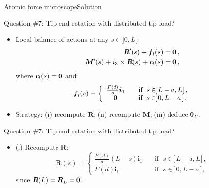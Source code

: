 \documentclass{beamer}
\newcommand{\cj}{c}
\newcommand{\cv}{{\boldsymbol\cj}}
\renewcommand{\ij}{i}
\newcommand{\iv}{{\boldsymbol\ij}}
\newcommand*{\drotj}{\theta}
\newcommand*{\drot}{{\boldsymbol\drotj}}
\newcommand{\fj}{f}
\newcommand{\fv}{{\boldsymbol\fj}}
\newcommand{\Fresj}{R}
\newcommand{\Mresj}{M}
\newcommand{\Fres}{{\boldsymbol\Fresj}}
\newcommand{\Mres}{{\boldsymbol\Mresj}}
\newcommand{\bzero}{{\bf 0}}
\begin{document}
\begin{frame}{Atomic force microscope}{Solution}

\begin{overprint}

\vskip-20pt
\begin{exampleblock}{Question \#7: Tip end rotation with distributed tip load?}
\begin{itemize}
\item Local balance of actions at any $s\in]0,L[$:
\begin{displaymath}
\begin{split}
\Fres'(s)+\fv_l(s) &=\bzero\,, \\
\Mres'(s)+\iv_3\times\Fres(s)+\cv_l(s) &=\bzero\,,
\end{split}
\end{displaymath}
where $\cv_l(s)=\bzero$ and:
\begin{displaymath}
\fv_l(s)=\left\{\begin{array}{cl}
\frac{F(d)}{a}\iv_1 & \quad\text{if}\;\;s\in]L-a,L[\,, \\
\bzero & \quad\text{if}\;\;s\in]0,L-a[\,.
\end{array}\right.
\end{displaymath}
\item Strategy: (i) recompute $\Fres$; (ii) recompute $\Mres$; (iii) deduce $\drot_\Sigma$.
\end{itemize}
\end{exampleblock}

\vskip-20pt
\begin{exampleblock}{Question \#7: Tip end rotation with distributed tip load?}
\begin{itemize}
\item (i) Recompute $\Fres$:
\begin{displaymath}
\Fres(s)=\left\{\begin{array}{cl}
\frac{F(d)}{a}(L-s)\iv_1 & \quad\text{if}\;\;s\in]L-a,L[\,, \\
F(d)\iv_1 & \quad\text{if}\;\;s\in]0,L-a[\,,
\end{array}\right.
\end{displaymath}
since $\Fres(L)=\Fres_L=\bzero$.
\end{itemize}
\end{exampleblock}


\end{overprint}
\end{frame}
\end{document}
